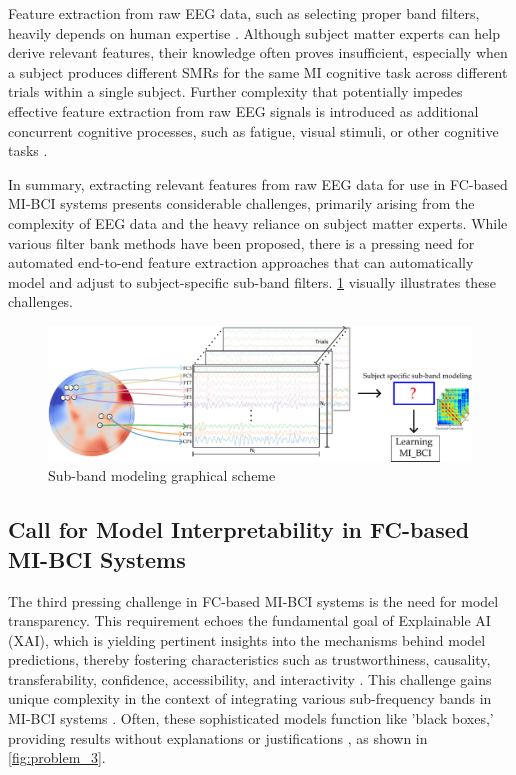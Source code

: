 Feature extraction from raw EEG data, such as selecting proper band filters, heavily depends on human expertise \cite{chamola2020brain, padfield2019eeg}. Although subject matter experts can help derive relevant features, their knowledge often proves insufficient, especially when a subject produces different SMRs for the same MI cognitive task across different trials within a single subject\cite{altaheri2023deep, vidaurre2020sensorimotor}. Further complexity that potentially impedes effective feature extraction from raw EEG signals is introduced as additional concurrent cognitive processes, such as fatigue, visual stimuli, or other cognitive tasks \cite{saha2020intra, ismail2020graph, meers2020motor, talukdar2019motor}.

In summary, extracting relevant features from raw EEG data for use in FC-based MI-BCI systems presents considerable challenges, primarily arising from the complexity of EEG data and the heavy reliance on subject matter experts. While various filter bank methods have been proposed, there is a pressing need for automated end-to-end feature extraction approaches that can automatically model and adjust to subject-specific sub-band filters. \cref{fig:problem_2} visually illustrates these challenges.


\begin{figure}[!h]
    \centering
    \includegraphics[width=0.9\linewidth]{Figures/Objective_2/problem2.pdf}
    \caption{Sub-band modeling graphical scheme}\label{fig:problem_2}
\end{figure}


\subsection{Call for Model Interpretability in FC-based MI-BCI Systems}

The third pressing challenge in FC-based MI-BCI systems is the need for model transparency. This requirement echoes the fundamental goal of Explainable AI (XAI), which is yielding pertinent insights into the mechanisms behind model predictions, thereby fostering characteristics such as trustworthiness, causality, transferability, confidence, accessibility, and interactivity \cite{smuha2019eu}. This challenge gains unique complexity in the context of integrating various sub-frequency bands in MI-BCI systems \cite{guillot2019benefits}. Often, these sophisticated models function like 'black boxes,' providing results without explanations or justifications \cite{ras2018explanation}, as shown in \cref{fig:problem_3}.


